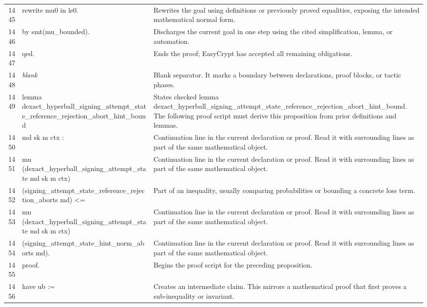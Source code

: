 \documentclass[10pt]{article}
\begin{document}
\begin{longtable}{r L{0.53\textwidth} L{0.37\textwidth}}
1445 & {\ttfamily\scriptsize rewrite mu0 in le0.} & Rewrites the goal using definitions or previously proved equalities, exposing the intended mathematical normal form. \\
1446 & {\ttfamily\scriptsize by smt(mu\_bounded).} & Discharges the current goal in one step using the cited simplification, lemma, or automation. \\
1447 & {\ttfamily\scriptsize qed.} & Ends the proof; EasyCrypt has accepted all remaining obligations. \\
1448 & {\ttfamily\scriptsize \emph{blank}} & Blank separator.  It marks a boundary between declarations, proof blocks, or tactic phases. \\
1449 & {\ttfamily\scriptsize lemma dexact\_hyperball\_signing\_attempt\_state\_reference\_rejection\_abort\_hint\_bound} & States checked lemma dexact\_hyperball\_signing\_attempt\_state\_reference\_rejection\_abort\_hint\_bound.  The following proof script must derive this proposition from prior definitions and lemmas. \\
1450 & {\ttfamily\scriptsize   md sk m ctx :} & Continuation line in the current declaration or proof.  Read it with surrounding lines as part of the same mathematical object. \\
1451 & {\ttfamily\scriptsize   mu (dexact\_hyperball\_signing\_attempt\_state md sk m ctx)} & Continuation line in the current declaration or proof.  Read it with surrounding lines as part of the same mathematical object. \\
1452 & {\ttfamily\scriptsize     (signing\_attempt\_state\_reference\_rejection\_aborts md) <=} & Part of an inequality, usually comparing probabilities or bounding a concrete loss term. \\
1453 & {\ttfamily\scriptsize   mu (dexact\_hyperball\_signing\_attempt\_state md sk m ctx)} & Continuation line in the current declaration or proof.  Read it with surrounding lines as part of the same mathematical object. \\
1454 & {\ttfamily\scriptsize     (signing\_attempt\_state\_hint\_norm\_aborts md).} & Continuation line in the current declaration or proof.  Read it with surrounding lines as part of the same mathematical object. \\
1455 & {\ttfamily\scriptsize proof.} & Begins the proof script for the preceding proposition. \\
1456 & {\ttfamily\scriptsize have ub :=} & Creates an intermediate claim.  This mirrors a mathematical proof that first proves a sub-inequality or invariant. \\

\end{longtable}
\end{document}

